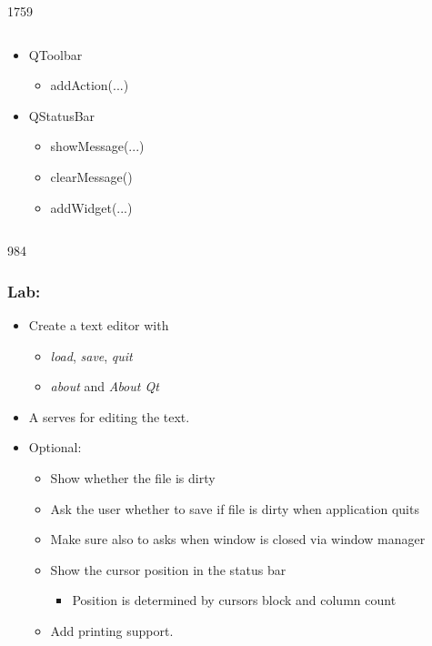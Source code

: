 \begin{slide}{1759}
\begin{columns}[t]
\begin{column}[T]{5cm}
\begin{itemize}
     \item QToolbar
        \begin{itemize}
        \item addAction(...)
        \end{itemize}
        
      \item QStatusBar
        \begin{itemize}
        \item showMessage(...)
        \item clearMessage()
        \item addWidget(...)
        \end{itemize}
      \end{itemize}
    \end{column}
  \end{columns}
\end{slide}

\begin{slide}{984}
  \frametitle{Lab: }
\begin{itemize}
\item Create a text editor with
  \begin{itemize}
  \item \emph{load}, \emph{save}, \emph{quit}
  \item \emph{about} and \emph{About Qt}
  \end{itemize}
\item A  serves for editing the text.
\item Optional:
  \begin{itemize}
  \item Show whether the file is dirty
  \item Ask the user whether to save if file is dirty when application quits
  \item Make sure also to asks when window is closed via window manager
  \item Show the cursor position in the status bar
    \begin{itemize}
    \item Position is determined by cursors block and column count 
    \end{itemize}
  \item Add printing support. 
  \end{itemize}
\end{itemize}
\vfill
{}
\end{slide}
